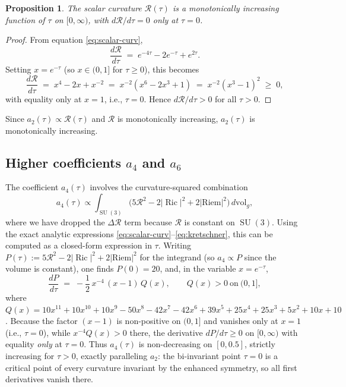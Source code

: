 \documentclass[12pt]{article}
\newtheorem{proposition}[theorem]{Proposition}
\theoremstyle{definition}
\theoremstyle{remark}
\DeclareMathOperator{\Ric}{Ric}
\DeclareMathOperator{\SU}{SU}
\begin{document}
\begin{proposition}\label{prop:R-monotone}
The scalar curvature $\mathcal{R}(\tau)$ is a monotonically increasing
function of $\tau$ on $[0, \infty)$, with $d\mathcal{R}/d\tau = 0$
only at $\tau = 0$.
\end{proposition}

\begin{proof}
From equation \eqref{eq:scalar-curv},
\begin{equation}
  \frac{d\mathcal{R}}{d\tau} \;=\; e^{-4\tau} - 2e^{-\tau} + e^{2\tau}.
\end{equation}
Setting $x = e^{-\tau}$ (so $x \in (0,1]$ for $\tau \geq 0$), this
becomes
\begin{equation}
  \frac{d\mathcal{R}}{d\tau} \;=\; x^4 - 2x + x^{-2}
  \;=\; x^{-2}(x^6 - 2x^3 + 1)
  \;=\; x^{-2}(x^3 - 1)^2 \;\geq\; 0,
\end{equation}
with equality only at $x = 1$, i.e., $\tau = 0$.  Hence
$d\mathcal{R}/d\tau > 0$ for all $\tau > 0$.
\end{proof}

Since $a_2(\tau) \propto \mathcal{R}(\tau)$ and $\mathcal{R}$ is
monotonically increasing, $a_2(\tau)$ is monotonically increasing.


\subsection{Higher coefficients \texorpdfstring{$a_4$ and $a_6$}{a4 and a6}}

The coefficient $a_4(\tau)$ involves the curvature-squared
combination
\begin{equation}\label{eq:a4-integrand}
  a_4(\tau) \propto \int_{\SU(3)}\!\bigl(5\mathcal{R}^2
  - 2|\Ric|^2 + 2|\mathrm{Riem}|^2\bigr)\, d\mathrm{vol}_g,
\end{equation}
where we have dropped the $\Delta\mathcal{R}$ term because
$\mathcal{R}$ is constant on $\SU(3)$.  Using the exact analytic
expressions \eqref{eq:scalar-curv}--\eqref{eq:kretschner}, this can
be computed as a closed-form expression in $\tau$.  Writing
$P(\tau) := 5\mathcal{R}^2 - 2|\Ric|^2 + 2|\mathrm{Riem}|^2$ for the
integrand (so $a_4 \propto P$ since the volume is constant), one finds
$P(0) = 20$, and, in the variable $x = e^{-\tau}$,
\begin{equation}\label{eq:dP-factored}
  \frac{dP}{d\tau}
  \;=\; -\frac{1}{2}\,x^{-4}\,(x-1)\,
  Q(x), \qquad
  Q(x) > 0 \ \text{on}\ (0,1],
\end{equation}
where $Q(x) = 10x^{11}+10x^{10}+10x^9-50x^8-42x^7-42x^6+39x^5+25x^4
+25x^3+5x^2+10x+10$.  Because the factor $(x-1)$ is non-positive on
$(0,1]$ and vanishes only at $x=1$ (i.e., $\tau=0$), while
$x^{-4}Q(x) > 0$ there, the derivative $dP/d\tau \geq 0$ on
$[0,\infty)$ with equality \emph{only} at $\tau=0$.  Thus $a_4(\tau)$
is non-decreasing on $[0,0.5]$, strictly increasing for $\tau>0$,
exactly paralleling $a_2$: the bi-invariant point $\tau=0$ is a
critical point of every curvature invariant by the enhanced symmetry,
so all first derivatives vanish there.
\end{document}
